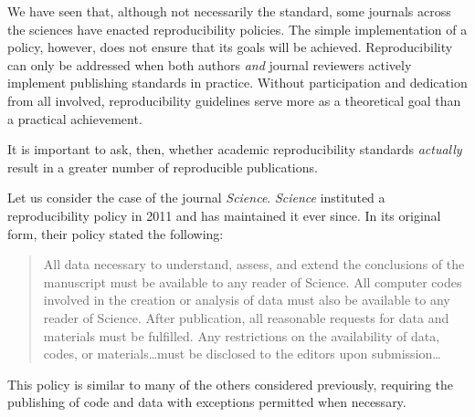 \documentclass[12pt,twoside]{reedthesis}
\begin{document}
We have seen that, although not necessarily the standard, some journals
across the sciences have enacted reproducibility policies. The simple
implementation of a policy, however, does not ensure that its goals will
be achieved. Reproducibility can only be addressed when both authors
\emph{and} journal reviewers actively implement publishing standards in
practice. Without participation and dedication from all involved,
reproducibility guidelines serve more as a theoretical goal than a
practical achievement.

It is important to ask, then, whether academic reproducibility standards
\emph{actually} result in a greater number of reproducible publications.

Let us consider the case of the journal \emph{Science}. \emph{Science}
instituted a reproducibility policy in 2011 and has maintained it ever
since. In its original form, their policy stated the following:
\begin{quote}
All data necessary to understand, assess, and extend the conclusions of
the manuscript must be available to any reader of Science. All computer
codes involved in the creation or analysis of data must also be
available to any reader of Science. After publication, all reasonable
requests for data and materials must be fulfilled. Any restrictions on
the availability of data, codes, or materials\ldots{}must be disclosed
to the editors upon submission\ldots{}
\end{quote}
This policy is similar to many of the others considered previously,
requiring the publishing of code and data with exceptions permitted when
necessary.
\end{document}
